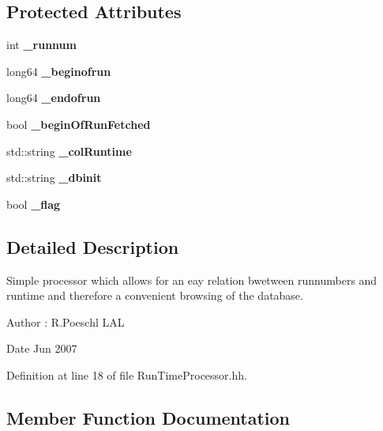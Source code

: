 \subsection*{Protected Attributes}
\begin{DoxyCompactItemize}
\item 
int {\bfseries \-\_\-runnum}\label{classmarlin_1_1RunTimeProcessor_a226602232ec99af268c81e0b928aa785}

\item 
long64 {\bfseries \-\_\-beginofrun}\label{classmarlin_1_1RunTimeProcessor_a2801c1b8c0d4daa85e436ea969549629}

\item 
long64 {\bfseries \-\_\-endofrun}\label{classmarlin_1_1RunTimeProcessor_a1769a8281ce2531d7e486bd852dc5fd6}

\item 
bool {\bfseries \-\_\-begin\-Of\-Run\-Fetched}\label{classmarlin_1_1RunTimeProcessor_a064ab19d742cc513c1c3415e7fbba7b5}

\item 
std\-::string {\bfseries \-\_\-col\-Runtime}\label{classmarlin_1_1RunTimeProcessor_a6526b4be2886ba43df9208122a1ebf96}

\item 
std\-::string {\bfseries \-\_\-dbinit}\label{classmarlin_1_1RunTimeProcessor_ae1fe5999ff7a51f6eb2bfb21670fd4d5}

\item 
bool {\bfseries \-\_\-flag}\label{classmarlin_1_1RunTimeProcessor_afba9e89de5bf364a966fe0b920c346ad}

\end{DoxyCompactItemize}


\subsection{Detailed Description}
Simple processor which allows for an eay relation bwetween runnumbers and runtime and therefore a convenient browsing of the database. 

\begin{DoxyAuthor}{Author}
\-: R.\-Poeschl L\-A\-L
\end{DoxyAuthor}
\begin{DoxyDate}{Date}
Jun 2007 
\end{DoxyDate}


Definition at line 18 of file Run\-Time\-Processor.\-hh.



\subsection{Member Function Documentation}
